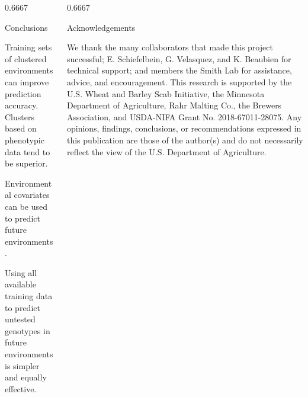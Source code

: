 \documentclass[final]{beamer}
\newlength{\onecolwid}
\newlength{\twocolwid}
\begin{document}
\begin{frame}[t]
\begin{columns}[t]
\begin{column}{\twocolwid}
\begin{columns}[t,totalwidth=\twocolwid]
\begin{column}{0.6667\onecolwid}


\begin{alertblock}{Conclusions}

\begin{footnotesize}

Training sets of clustered environments can improve prediction accuracy. Clusters based on phenotypic data tend to be superior.

\vspace{0.5cm}

Environmental covariates can be used to predict future environments.

\vspace{0.5cm}

Using all available training data to predict untested genotypes in future environments is simpler and equally effective.



\end{footnotesize}

\end{alertblock}


\end{column}




\begin{column}{0.6667\onecolwid} %



\begin{block}{\large{Acknowledgements}}

\begin{tiny}

We thank the many collaborators that made this project successful; E. Schiefelbein, G. Velasquez, and K. Beaubien for technical support; and members the Smith Lab for assistance, advice, and encouragement. This research is supported by the U.S. Wheat and Barley Scab Initiative, the Minnesota Department of Agriculture, Rahr Malting Co., the Brewers Association, and USDA-NIFA Grant No. 2018-67011-28075. Any opinions, findings, conclusions, or recommendations expressed in this publication are those of the author(s) and do not necessarily reflect the view of the U.S. Department of Agriculture.


\end{tiny}
\end{block}
\end{column}
\end{columns}
\end{column}
\end{columns}
\end{frame}
\end{document}
